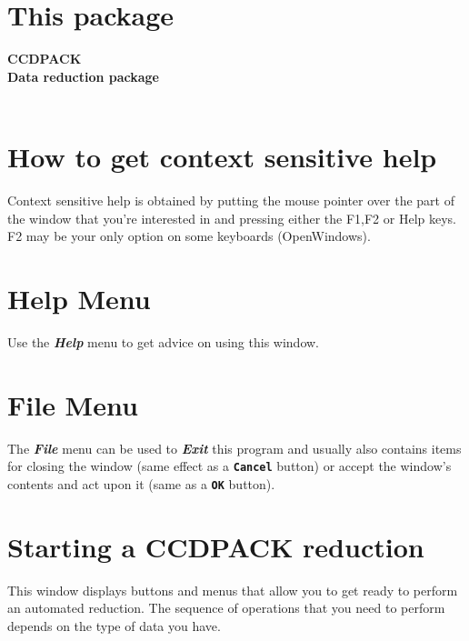 \documentclass[11pt,nolof]{starlink}
\providecommand{\butt}[1]{{\bf \tt #1}}
\providecommand{\menu}[1]{{\bf \em #1}}
\begin{document}
\scfrontmatter







\section{This package }

\begin{center}
{\Huge \bf  CCDPACK \\
\LARGE Data reduction package \\
\Large \emph{\stardocversion} \\
}
\thestardocdate
\end{center}

\section{How to get context sensitive help }
Context sensitive help is obtained by putting the mouse pointer over
the part of the window that you're interested in and pressing either
the F1,F2 or Help keys. F2 may be your only option on some keyboards
(OpenWindows).

\section{Help Menu }
Use the \menu{Help} menu to get advice on using this window.

\section{File Menu }
The \menu{File} menu can be used to \menu{Exit} this program and
usually also contains items for closing the window (same effect as a
\butt{Cancel} button) or accept the window's contents and act
upon it (same as a \butt{OK} button).

\section{Starting a CCDPACK reduction }
This window displays buttons and menus that allow you to get
ready to perform an automated reduction. The sequence of operations
that you need to perform depends on the type of data you have.
\end{document}

